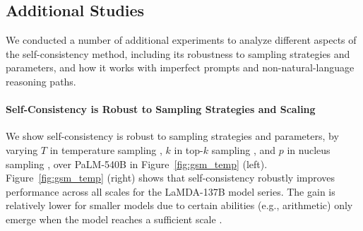 \documentclass{article} %
\begin{document}
\subsection{Additional Studies}
\label{sec:ablation_sampling}
We conducted a number of additional experiments to analyze different aspects of the self-consistency method, including its robustness to sampling strategies and parameters, and how it works with imperfect prompts and  non-natural-language reasoning paths.

\vspace{-0.1in}
\paragraph{Self-Consistency is Robust to Sampling Strategies and Scaling}
We show self-consistency is robust to sampling strategies and parameters, by varying $T$ in temperature sampling \citep{ACKLEY1985147,ficler-goldberg-2017-controlling}, 
$k$ in top-$k$ sampling \citep{fan-etal-2018-hierarchical,holtzman-etal-2018-learning,Radford2019LanguageMA}, and $p$ in nucleus sampling \citep{nucleus_sampling}, over PaLM-540B in Figure~\ref{fig:gsm_temp} (left).
Figure~\ref{fig:gsm_temp} (right) shows that self-consistency robustly improves performance across all scales for the LaMDA-137B model series. 
The gain is relatively lower for smaller models due to certain abilities (e.g., arithmetic) only emerge when the model reaches a sufficient scale \citep{brown2020language}.


\end{document}

